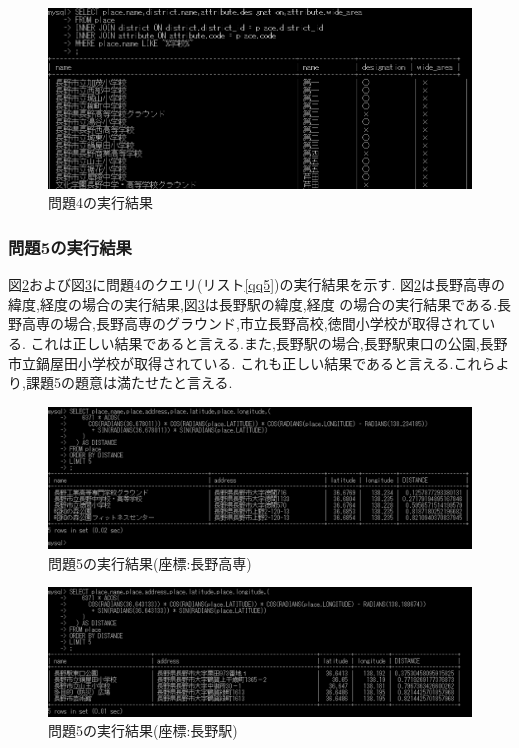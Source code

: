 \documentclass[a4j]{jarticle}
\begin{document}
    \begin{figure}[H]
      \centering
      \includegraphics[scale=1.0]{kadai4-4.png}
      \caption{問題4の実行結果}
       \label{kadai4-4}
      \end{figure}

    \subsubsection{問題5の実行結果}
    図\ref{kadai4-5-1}および図\ref{kadai4-5-2}に問題4のクエリ(リスト\ref{qq5})の実行結果を示す.
    図\ref{kadai4-5-1}は長野高専の緯度,経度の場合の実行結果,図\ref{kadai4-5-2}は長野駅の緯度,経度
    の場合の実行結果である.長野高専の場合,長野高専のグラウンド,市立長野高校,徳間小学校が取得されている.
    これは正しい結果であると言える.また,長野駅の場合,長野駅東口の公園,長野市立鍋屋田小学校が取得されている.
    これも正しい結果であると言える.これらより,課題5の題意は満たせたと言える.

      \begin{figure}[H]
      \centering
      \includegraphics[scale=0.7]{kadai4-5-1.png}
      \caption{問題5の実行結果(座標:長野高専)}
       \label{kadai4-5-1}
      \end{figure}

      \begin{figure}[H]
        \centering
        \includegraphics[scale=0.7]{kadai4-5-2.png}
        \caption{問題5の実行結果(座標:長野駅)}
         \label{kadai4-5-2}
        \end{figure}
\end{document}
